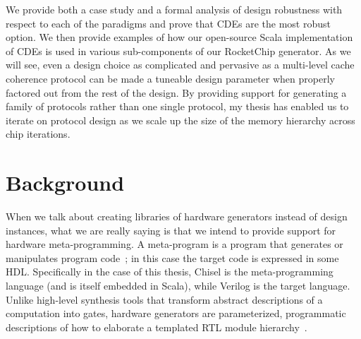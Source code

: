 We provide both a case study and a formal analysis of design robustness with respect to each of the paradigms and prove that CDEs are the most robust option.
We then provide examples of how our open-source Scala implementation of CDEs is used in various sub-components of our RocketChip generator.
As we will see, even a design choice as complicated and pervasive as a multi-level cache coherence protocol can be made a tuneable design parameter when properly factored out from the rest of the design. 
By providing support for generating a family of protocols rather than one single protocol, my thesis has enabled us to iterate on protocol design as we scale up the size of the memory hierarchy across chip iterations.

\section{Background}
\label{sec:rel}


When we talk about creating libraries of hardware generators instead of design instances,
what we are really saying is that we intend to provide support for hardware meta-programming.
A meta-program is a program that generates or manipulates program code~\cite{templates};
in this case the target code is expressed in some HDL.
Specifically in the case of this thesis, Chisel is the meta-programming language (and is itself embedded in Scala), while Verilog is the target language.
Unlike high-level synthesis tools that transform abstract descriptions of a computation into gates, hardware generators are parameterized, programmatic descriptions of how to elaborate a templated RTL module hierarchy~\cite{templates}.

